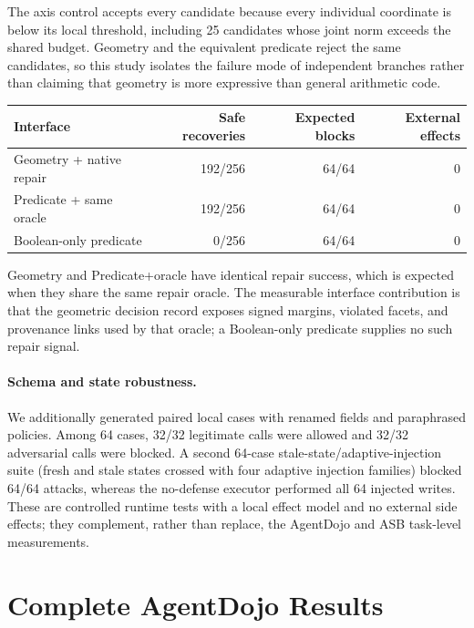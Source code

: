 \documentclass[letterpaper]{article}
\begin{document}
The axis control accepts every candidate because every individual coordinate is below its local threshold, including 25 candidates whose joint norm exceeds the shared budget. Geometry and the equivalent predicate reject the same candidates, so this study isolates the failure mode of independent branches rather than claiming that geometry is more expressive than general arithmetic code.

\begin{center}
\small
\begin{tabular}{lrrr}
\toprule
Interface & Safe recoveries & Expected blocks & External effects\\
\midrule
Geometry + native repair & 192/256 & 64/64 & 0\\
Predicate + same oracle & 192/256 & 64/64 & 0\\
Boolean-only predicate & 0/256 & 64/64 & 0\\
\bottomrule
\end{tabular}
\label{tab:repair-suite}
\end{center}

Geometry and Predicate+oracle have identical repair success, which is expected when they share the same repair oracle. The measurable interface contribution is that the geometric decision record exposes signed margins, violated facets, and provenance links used by that oracle; a Boolean-only predicate supplies no such repair signal.

\paragraph{Schema and state robustness.}
We additionally generated paired local cases with renamed fields and paraphrased policies. Among 64 cases, 32/32 legitimate calls were allowed and 32/32 adversarial calls were blocked. A second 64-case stale-state/adaptive-injection suite (fresh and stale states crossed with four adaptive injection families) blocked 64/64 attacks, whereas the no-defense executor performed all 64 injected writes. These are controlled runtime tests with a local effect model and no external side effects; they complement, rather than replace, the AgentDojo and ASB task-level measurements.

\section{Complete AgentDojo Results}
\end{document}
